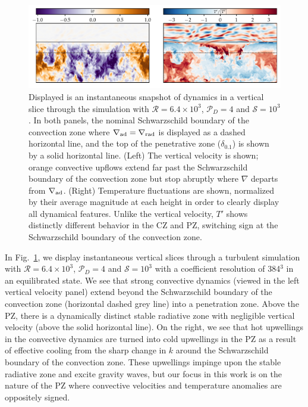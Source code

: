 \documentclass{aastex631}
\newcommand{\gradrad}{\ensuremath{\nabla_{\rm{rad}}}}
\newcommand{\gradad}{\ensuremath{\nabla_{\rm{ad}}}}
\newcommand{\justgrad}{\ensuremath{\nabla}}
\newcommand{\mP}{\ensuremath{\mathcal{P}}}
\newcommand{\mR}{\ensuremath{\mathcal{R}}}
\newcommand{\mS}{\ensuremath{\mathcal{S}}}
\begin{document}
\begin{figure}[t!]
\centering
\includegraphics[width=\textwidth]{vertical_dynamics_panels.pdf}
\caption{
Displayed is an instantaneous snapshot of dynamics in a vertical slice through the simulation with $\mR = 6.4 \times 10^3$, $\mP_D = 4$ and $\mS = 10^3$.
In both panels, the nominal Schwarzschild boundary of the convection zone where $\gradad = \gradrad$ is displayed as a dashed horizontal line, and the top of the penetrative zone ($\delta_{0.1}$) is shown by a solid horizontal line.
(Left) The vertical velocity is shown; orange convective upflows extend far past the Schwarzschild boundary of the convection zone but stop abruptly where $\justgrad$ departs from $\gradad$.
(Right) Temperature fluctuations are shown, normalized by their average magnitude at each height in order to clearly display all dynamical features.
Unlike the vertical velocity, $T'$ shows distinctly different behavior in the CZ and PZ, switching sign at the Schwarzschild boundary of the convection zone.
\label{fig:vertical_dynamics_panels}
}
\end{figure}

In Fig.~\ref{fig:vertical_dynamics_panels}, we display instantaneous vertical slices through a turbulent simulation with $\mR = 6.4 \times 10^3$, $\mP_D = 4$ and $\mS = 10^3$ with a coefficient resolution of 384$^3$ in an equilibrated state.
We see that strong convective dynamics (viewed in the left vertical velocity panel) extend beyond the Schwarzschild boundary of the convection zone (horizontal dashed grey line) into a penetration zone.
Above the PZ, there is a dynamically distinct stable radiative zone with negligible vertical velocity (above the solid horizontal line).
On the right, we see that hot upwellings in the convective dynamics are turned into cold upwellings in the PZ as a result of effective cooling from the sharp change in $k$ around the Schwarzschild boundary of the convection zone.
These upwellings impinge upon the stable radiative zone and excite gravity waves, but our focus in this work is on the nature of the PZ where convective velocities and temperature anomalies are oppositely signed.
\end{document}

